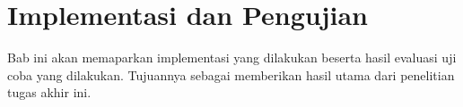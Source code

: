 \chapter{Implementasi dan Pengujian}
\label{chapter:implementasi-dan-pengujian}
Bab ini akan memaparkan implementasi yang dilakukan beserta hasil evaluasi uji coba yang dilakukan. Tujuannya sebagai memberikan hasil utama dari penelitian tugas akhir ini.







